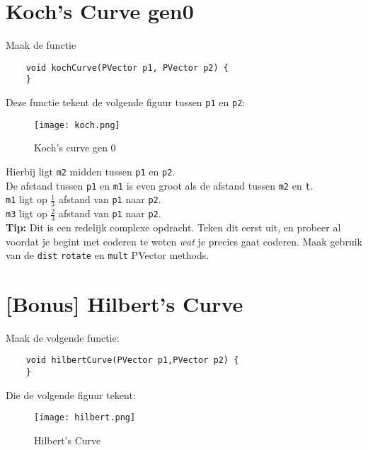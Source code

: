 \section{Koch's Curve gen0}
Maak de functie
\begin{lstlisting}
	void kochCurve(PVector p1, PVector p2) {
	}
\end{lstlisting}
Deze functie tekent de volgende figuur tussen \texttt{p1} en \texttt{p2}:
\begin{figure}[h!]
	\centering
	\texttt{[image: koch.png]}
	\label{fig:koch}
	\caption{Koch's curve gen 0}
\end{figure}
Hierbij ligt \texttt{m2} midden tussen \texttt{p1} en \texttt{p2}.\\
De afstand tussen \texttt{p1} en \texttt{m1} is even groot als de afstand tussen \texttt{m2} en \texttt{t}.\\
\texttt{m1} ligt op $\frac{1}{3}$ afstand van \texttt{p1} naar \texttt{p2}.\\
\texttt{m3} ligt op $\frac{2}{3}$ afstand van \texttt{p1} naar \texttt{p2}.\\
\textbf{Tip:} Dit is een redelijk complexe opdracht. Teken dit eerst uit, en probeer al voordat je begint met coderen te weten \textit{wat} je precies gaat coderen. Maak gebruik van de \texttt{dist} \texttt{rotate} en \texttt{mult} PVector methods.

\section{[Bonus] Hilbert's Curve}
Maak de volgende functie:
\begin{lstlisting}
	void hilbertCurve(PVector p1,PVector p2) {
	} 
\end{lstlisting}
Die de volgende figuur tekent:
\begin{figure}[h!]
	\centering
	\texttt{[image: hilbert.png]}
	\label{fig:koch}
	\caption{Hilbert's Curve}
\end{figure}

